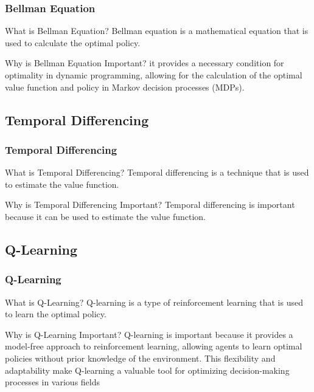 \documentclass[aspectratio=169, hideothersubsections]{beamer}
\begin{document}
\begin{frame}
  \frametitle{Bellman Equation}
  \begin{block}{What is Bellman Equation?}
    Bellman equation is a mathematical equation that is used to calculate the optimal policy.
  \end{block}
  \begin{block}{Why is Bellman Equation Important?}
    it provides a necessary condition for optimality in dynamic programming, allowing for the calculation of the optimal value function and policy in Markov decision processes (MDPs). 
  \end{block}
\end{frame}

\subsection{Temporal Differencing}

\begin{frame}
  \frametitle{Temporal Differencing}
  \begin{block}{What is Temporal Differencing?}
    Temporal differencing is a technique that is used to estimate the value function.
  \end{block}
  \begin{block}{Why is Temporal Differencing Important?}
    Temporal differencing is important because it can be used to estimate the value function.
  \end{block}
\end{frame}

\subsection{Q-Learning}

\begin{frame}
  \frametitle{Q-Learning}
  \begin{block}{What is Q-Learning?}
    Q-learning is a type of reinforcement learning that is used to learn the optimal policy.
  \end{block}
  \begin{block}{Why is Q-Learning Important?}
    Q-learning is important because it provides a model-free approach to reinforcement learning, allowing agents to learn optimal policies without prior knowledge of the environment. This flexibility and adaptability make Q-learning a valuable tool for optimizing decision-making processes in various fields
  \end{block}
\end{frame}
\end{document}
